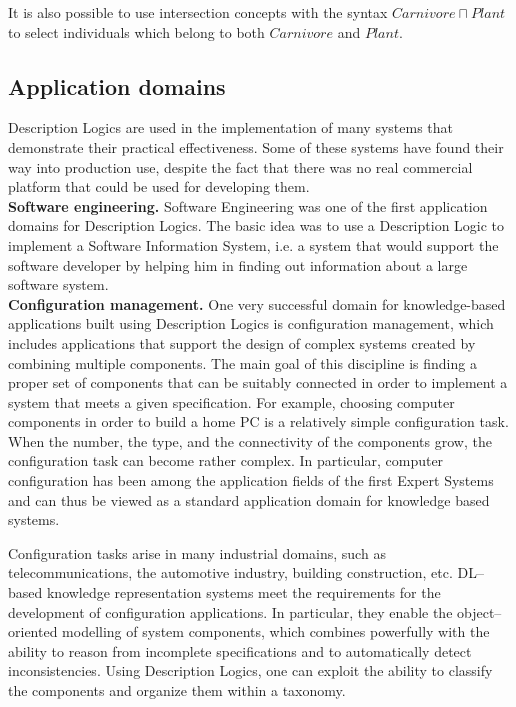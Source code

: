\documentclass[a4paper, 11pt, oneside]{elsarticle}
\begin{document}
It is also possible to use intersection concepts with the syntax $Carnivore \sqcap Plant$ to select individuals which belong to both $Carnivore$ and $Plant$.

\newpage

\subsection{Application domains}
Description Logics are used in the implementation of many systems that demonstrate their practical effectiveness. Some of these systems have found their way into production use, despite the fact that there was no real commercial platform that could be used for developing them.\\

\textbf{Software engineering.} Software Engineering was one of the first application domains for Description Logics. The basic idea was to use a Description Logic to implement a Software Information System, i.e. a system that would support the software developer by helping him in finding out information about a large software system.\\

\textbf{Configuration management.} One very successful domain for knowledge-based applications built using Description Logics is configuration management, which includes applications that support the design of complex systems created by combining multiple components.
The main goal of this discipline is finding a proper set of components that can be suitably connected in order to implement a system that meets a given specification.
For example, choosing computer components in order to build a home PC is a relatively simple configuration task.
When the number, the type, and the connectivity of the components grow, the configuration task can become rather complex.
In particular, computer configuration has been among the application fields of the first Expert Systems and can thus be viewed as a standard application domain for knowledge based systems.

Configuration tasks arise in many industrial domains, such as telecommunications, the automotive industry, building construction, etc.
DL--based knowledge representation systems meet the requirements for the development of configuration applications.
In particular, they enable the object--oriented modelling of system components, which combines powerfully with the ability to reason from incomplete specifications and to automatically detect inconsistencies.
Using Description Logics, one can exploit the ability to classify the components and organize them within a taxonomy.\\
\end{document}
